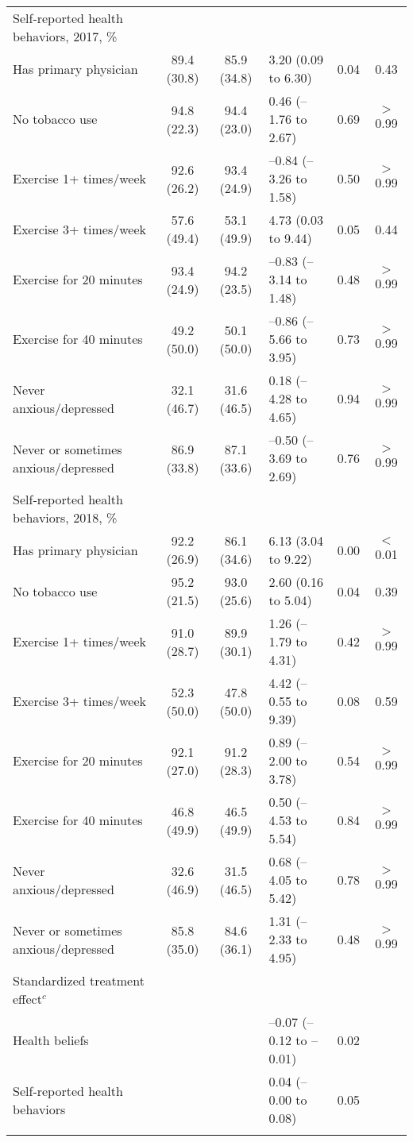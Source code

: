 \documentclass{article}
\begin{document}
\begin{table}[tbp]
{\begin{tabularx}{\linewidth}{lCClCC}
Self‐reported health behaviors, 2017, \%&&&&& \tabularnewline
\hspace{1em} Has primary physician&89.4  (30.8)&85.9  (34.8)&3.20 (0.09 to 6.30)&0.04&0.43 \tabularnewline
\hspace{1em} No tobacco use&94.8  (22.3)&94.4  (23.0)&0.46 (--1.76 to 2.67)&0.69&$>$0.99 \tabularnewline
\hspace{1em} Exercise 1+ times/week&92.6  (26.2)&93.4  (24.9)&--0.84 (--3.26 to 1.58)&0.50&$>$0.99 \tabularnewline
\hspace{1em} Exercise 3+ times/week&57.6  (49.4)&53.1  (49.9)&4.73 (0.03 to 9.44)&0.05&0.44 \tabularnewline
\hspace{1em} Exercise for 20 minutes&93.4  (24.9)&94.2  (23.5)&--0.83 (--3.14 to 1.48)&0.48&$>$0.99 \tabularnewline
\hspace{1em} Exercise for 40 minutes&49.2  (50.0)&50.1  (50.0)&--0.86 (--5.66 to 3.95)&0.73&$>$0.99 \tabularnewline
\hspace{1em} Never anxious/depressed&32.1  (46.7)&31.6  (46.5)&0.18 (--4.28 to 4.65)&0.94&$>$0.99 \tabularnewline
\hspace{1em} Never or sometimes anxious/depressed&86.9  (33.8)&87.1  (33.6)&--0.50 (--3.69 to 2.69)&0.76&$>$0.99 \tabularnewline
Self‐reported health behaviors, 2018, \%&&&&& \tabularnewline
\hspace{1em} Has primary physician&92.2  (26.9)&86.1  (34.6)&6.13 (3.04 to 9.22)&0.00&$<$0.01 \tabularnewline
\hspace{1em} No tobacco use&95.2  (21.5)&93.0  (25.6)&2.60 (0.16 to 5.04)&0.04&0.39 \tabularnewline
\hspace{1em} Exercise 1+ times/week&91.0  (28.7)&89.9  (30.1)&1.26 (--1.79 to 4.31)&0.42&$>$0.99 \tabularnewline
\hspace{1em} Exercise 3+ times/week&52.3  (50.0)&47.8  (50.0)&4.42 (--0.55 to 9.39)&0.08&0.59 \tabularnewline
\hspace{1em} Exercise for 20 minutes&92.1  (27.0)&91.2  (28.3)&0.89 (--2.00 to 3.78)&0.54&$>$0.99 \tabularnewline
\hspace{1em} Exercise for 40 minutes&46.8  (49.9)&46.5  (49.9)&0.50 (--4.53 to 5.54)&0.84&$>$0.99 \tabularnewline
\hspace{1em} Never anxious/depressed&32.6  (46.9)&31.5  (46.5)&0.68 (--4.05 to 5.42)&0.78&$>$0.99 \tabularnewline
\hspace{1em} Never or sometimes anxious/depressed&85.8  (35.0)&84.6  (36.1)&1.31 (--2.33 to 4.95)&0.48&$>$0.99 \tabularnewline
Standardized treatment effect$^{c}$&&&&& \tabularnewline
\hspace{1em} Health beliefs&&&--0.07 (--0.12 to --0.01)&0.02& \tabularnewline
\hspace{1em} Self‐reported health behaviors&&&0.04 (--0.00 to 0.08)&0.05& \tabularnewline
\bottomrule \addlinespace[\belowrulesep]


\end{tabularx}}
\end{table}
\end{document}
